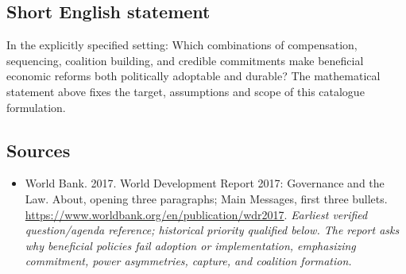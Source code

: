 \documentclass[11pt]{article}
\begin{document}
\subsection{Short English statement}
In the explicitly specified setting: Which combinations of compensation, sequencing, coalition building, and credible commitments make beneficial economic reforms both politically adoptable and durable? The mathematical statement above fixes the target, assumptions and scope of this catalogue formulation.

\subsection{Sources}
\begin{itemize}\raggedright
\item[\textnormal{[S1]}]\hypertarget{source:30007671:1}{} World Bank. 2017. World Development Report 2017: Governance and the Law. About, opening three paragraphs; Main Messages, first three bullets.
\url{https://www.worldbank.org/en/publication/wdr2017}.
{\small\textit{Earliest verified question/agenda reference; historical priority qualified below. The report asks why beneficial policies fail adoption or implementation, emphasizing commitment, power asymmetries, capture, and coalition formation.}}
\end{itemize}
\end{document}
